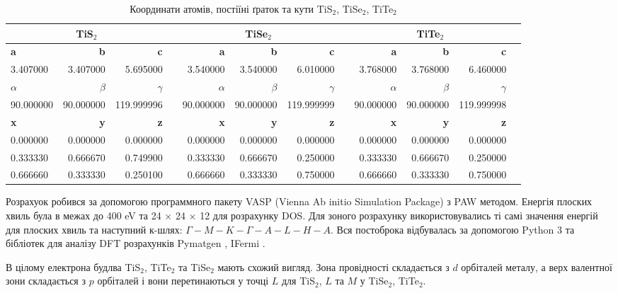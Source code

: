 \begin{table}[!htp]\centering

\scriptsize
\begin{tabular}{lrrrrrrrrrrr}\toprule
\multicolumn{3}{c}{\textbf{TiS$_2$}} & &\multicolumn{3}{c}{\textbf{TiSe$_2$}} & &\multicolumn{3}{c}{\textbf{TiTe$_2$}} \\\midrule
\textbf{a} &\textbf{b} &\textbf{c} & &\textbf{a} &\textbf{b} &\textbf{c} & &\textbf{a} &\textbf{b} &\textbf{c} \\
3.407000 &3.407000 &5.695000 & &3.540000 &3.540000 &6.010000 & &3.768000 &3.768000 &6.460000 \\
\textbf{$\alpha$} &\textbf{$\beta$} &\textbf{$\gamma$} & &\textbf{$\alpha$} &\textbf{$\beta$} &\textbf{$\gamma$} & &\textbf{$\alpha$} &\textbf{$\beta$} &\textbf{$\gamma$} \\
90.000000 &90.000000 &119.999996 & &90.000000 &90.000000 &119.999999 & &90.000000 &90.000000 &119.999998 \\
\textbf{x} &\textbf{y} &\textbf{z} & &\textbf{x} &\textbf{y} &\textbf{z} & &\textbf{x} &\textbf{y} &\textbf{z} \\
0.000000 &0.000000 &0.000000 & &0.000000 &0.000000 &0.000000 & &0.000000 &0.000000 &0.000000 \\
0.333330 &0.666670 &0.749900 & &0.333330 &0.666670 &0.250000 & &0.333330 &0.666670 &0.250000 \\
0.666660 &0.333330 &0.250100 & &0.666660 &0.333330 &0.750000 & &0.666660 &0.333330 &0.750000 \\
\bottomrule
\end{tabular}
\caption{Координати атомів, постіїні ґраток та кути TiS$_2$, TiSe$_2$, TiTe$_2$}\label{tab:Structure}
\end{table}

Розрахуок робився за допомогою программного пакету VASP (Vienna Ab initio Simulation Package) \cite{VASP1,VASP2, VASP3, VASP4} з PAW методом. Енергія плоских хвиль була в межах до 400 eV та 24 $\times$ 24 $\times$ 12 для розрахунку DOS. Для зоного розрахунку використовувались ті самі значення енергій для плоских хвиль та наступний к-шлях: $\Gamma-M-K-\Gamma-A-L-H-A$.
Вся постоброка відбувалась за допомогою Python 3 \cite{Python} та бібліотек для аналізу DFT розрахунків Pymatgen \cite{PyMatgen}, IFermi \cite{Ifermi}. 

В цілому електрона будлва TiS$_2$, TiTe$_2$ та TiSe$_2$ мають схожий вигляд. Зона провідності складається з $d$ орбіталей металу, а верх валентної зони складається з $p$ орбіталей і вони перетинаються у точці $L$ для TiS$_2$, $L$ та $M$ у TiSe$_2$, TiTe$_2$. 

